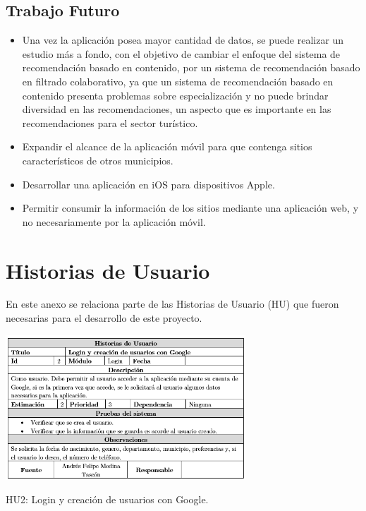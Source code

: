 \documentclass[12pt,letterpaper,openany]{book}
\begin{document}
\section{Trabajo Futuro}
\begin{itemize}
\item Una vez la aplicación posea mayor cantidad de datos, se puede realizar un estudio más a fondo, con el objetivo de cambiar el enfoque del sistema de recomendación basado en contenido, por un sistema de recomendación basado en filtrado colaborativo, ya que un sistema de recomendación basado en contenido presenta problemas sobre especialización y no puede brindar diversidad en las recomendaciones, un aspecto que es importante en las recomendaciones para el sector turístico.
\item Expandir el alcance de la aplicación móvil para que contenga sitios característicos de otros municipios.
\item Desarrollar una aplicación en iOS para dispositivos Apple.
\item Permitir consumir la información de los sitios mediante una aplicación web, y no necesariamente por la aplicación móvil.
\end{itemize}


\appendix
\chapter{Historias de Usuario}\label{aped.A}
En este anexo se relaciona parte de las Historias de Usuario (HU) que fueron necesarias para el desarrollo de este proyecto.	
\begin{table}[H]
\centering
\includegraphics[width=9cm]{./imagenes/HU/HU2}
\caption{HU2: Login y creación de usuarios con Google.}
\end{table}
\end{document}
